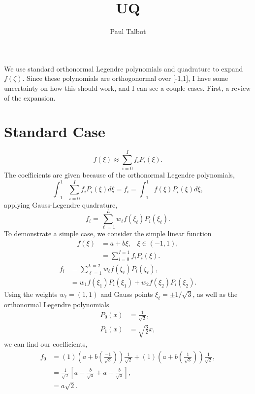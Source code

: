 \documentclass[11pt]{article} %
\title{UQ}
\author{Paul Talbot}
\newcommand{\into}{\ensuremath{\int_{-1}^1}}
\begin{document}
\maketitle



We use standard orthonormal Legendre polynomials and quadrature to expand $f(\zeta)$.  Since these polynomials are orthogonormal over [-1,1], I have some uncertainty on how this should work, and I can see a couple cases.  First, a review of the expansion.

\section{Standard Case}
\begin{equation}
f(\xi) \approx \sum_{i=0}^I f_i P_i(\xi).
\end{equation}
The coefficients are given because of the orthonormal Legendre polynomials,
\begin{equation}
 \into\sum_{i=0}^I f_i P_i(\xi) d\xi = f_i = \into f(\xi)P_i(\xi) d\xi,
\end{equation}
applying Gauss-Legendre quadrature,
\begin{equation}
f_i = \sum_{\ell=1}^L w_\ell f(\xi_\ell)P_i(\xi_\ell).
\end{equation}
To demonstrate a simple case, we consider the simple linear function
\begin{align}
f(\xi)&=a+b\xi,\hspace{10pt}\xi\in(-1,1),\\
  &=\sum_{i=0}^{I=1} f_iP_i(\xi).
\end{align}
\begin{align}
f_i&=\sum_{\ell=1}^{L=2} w_\ell f(\xi_\ell)P_i(\xi_\ell),\\
  &= w_1 f(\xi_1)P_i(\xi_1) + w_2 f(\xi_2)P_i(\xi_2).
\end{align}
Using the weights $w_\ell=(1,1)$ and Gauss points $\xi_\ell = \pm 1/\sqrt{3}$, as well as the orthonormal Legendre polynomials
\begin{align}
P_0(x)&=\frac{1}{\sqrt{2}},\\
P_1(x)&=\sqrt{\frac{3}{2}}x,
\end{align}
we can find our coefficients,
\begin{align}
f_0 &= (1)\left(a+b\left(\frac{-1}{\sqrt{3}}\right)\right)\frac{1}{\sqrt{2}} + (1)\left(a+b\left(\frac{1}{\sqrt{3}}\right)\right)\frac{1}{\sqrt{2}},\\
  &=\frac{1}{\sqrt{2}}\left[a-\frac{b}{\sqrt{3}}+a+\frac{b}{\sqrt{3}}\right],\\
  &= a\sqrt{2}.
\end{align}
\end{document}
